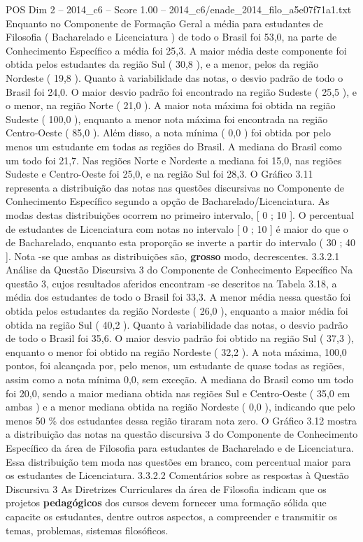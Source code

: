 \begin{textsample}{POS Dim 2 – 2014\_c6 – Score 1.00 – 2014\_c6/enade\_2014\_filo\_a5e07f71a1.txt}
Enquanto no Componente de Formação Geral a média para estudantes de Filosofia ( Bacharelado e Licenciatura ) de todo o Brasil foi 53,0, na parte de Conhecimento Específico a média foi 25,3.
A maior média deste componente foi obtida pelos estudantes da região Sul ( 30,8 ), e a menor, pelos da região Nordeste ( 19,8 ).
Quanto à variabilidade das notas, o desvio padrão de todo o Brasil foi 24,0.
O maior desvio padrão foi encontrado na região Sudeste ( 25,5 ), e o menor, na região Norte ( 21,0 ).
A maior nota máxima foi obtida na região Sudeste ( 100,0 ), enquanto a menor nota máxima foi encontrada na região Centro-Oeste ( 85,0 ).
Além disso, a nota mínima ( 0,0 ) foi obtida por pelo menos um estudante em todas as regiões do Brasil.
A mediana do Brasil como um todo foi 21,7.
Nas regiões Norte e Nordeste a mediana foi 15,0, nas regiões Sudeste e Centro-Oeste foi 25,0, e na região Sul foi 28,3.
O Gráfico 3.11 representa a distribuição das notas nas questões discursivas no Componente de Conhecimento Específico segundo a opção de Bacharelado/Licenciatura.
As modas destas distribuições ocorrem no primeiro intervalo, [ 0 ; 10 ].
O percentual de estudantes de Licenciatura com notas no intervalo [ 0 ; 10 ] é maior do que o de Bacharelado, enquanto esta proporção se inverte a partir do intervalo ( 30 ; 40 ].
Nota -se que ambas as distribuições são, \textbf{grosso} modo, decrescentes. 3.3.2.1 Análise da Questão Discursiva 3 do Componente de Conhecimento Específico Na questão 3, cujos resultados aferidos encontram -se descritos na Tabela 3.18, a média dos estudantes de todo o Brasil foi 33,3.
A menor média nessa questão foi obtida pelos estudantes da região Nordeste ( 26,0 ), enquanto a maior média foi obtida na região Sul ( 40,2 ).
Quanto à variabilidade das notas, o desvio padrão de todo o Brasil foi 35,6.
O maior desvio padrão foi obtido na região Sul ( 37,3 ), enquanto o menor foi obtido na região Nordeste ( 32,2 ).
A nota máxima, 100,0 pontos, foi alcançada por, pelo menos, um estudante de quase todas as regiões, assim como a nota mínima 0,0, sem exceção.
A mediana do Brasil como um todo foi 20,0, sendo a maior mediana obtida nas regiões Sul e Centro-Oeste ( 35,0 em ambas ) e a menor mediana obtida na região Nordeste ( 0,0 ), indicando que pelo menos 50 \% dos estudantes dessa região tiraram nota zero.
O Gráfico 3.12 mostra a distribuição das notas na questão discursiva 3 do Componente de Conhecimento Específico da área de Filosofia para estudantes de Bacharelado e de Licenciatura.
Essa distribuição tem moda nas questões em branco, com percentual maior para os estudantes de Licenciatura. 3.3.2.2 Comentários sobre as respostas à Questão Discursiva 3 As Diretrizes Curriculares da área de Filosofia indicam que os projetos \textbf{pedagógicos} dos cursos devem fornecer uma formação sólida que capacite os estudantes, dentre outros aspectos, a compreender e transmitir os temas, problemas, sistemas filosóficos.

\end{textsample}
